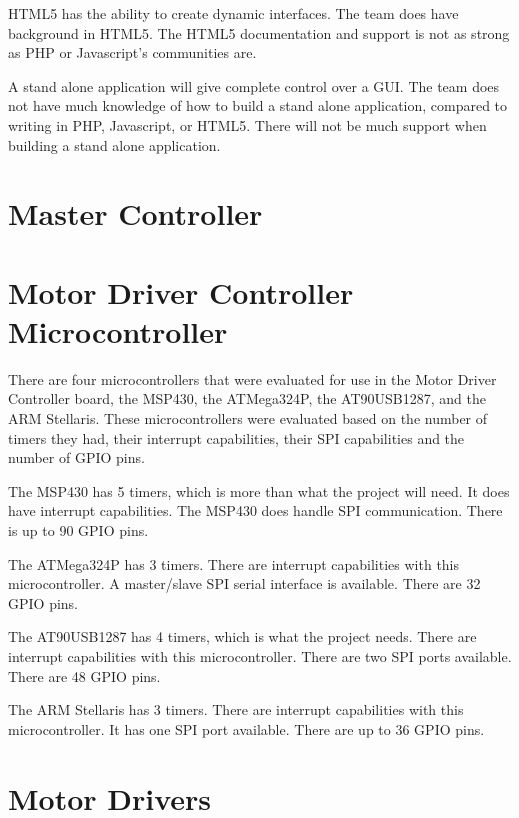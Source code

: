 HTML5 has the ability to create dynamic interfaces.
The team does have background in HTML5.
The HTML5 documentation and support is not as strong as PHP or Javascript's communities are.

A stand alone application will give complete control over a GUI.
The team does not have much knowledge of how to build a stand alone application, compared to writing in PHP, Javascript, or HTML5.
There will not be much support when building a stand alone application.

\section{Master Controller}

\section{Motor Driver Controller Microcontroller}
There are four microcontrollers that were evaluated for use in the Motor Driver Controller board, the MSP430, the ATMega324P, the AT90USB1287, and the ARM Stellaris.
These microcontrollers were evaluated based on the number of timers they had, their interrupt capabilities, their SPI capabilities and the number of GPIO pins.

The MSP430 has 5 timers, which is more than what the project will need.
It does have interrupt capabilities.
The MSP430 does handle SPI communication. 
There is up to 90 GPIO pins.

The ATMega324P has 3 timers.
There are interrupt capabilities with this microcontroller.
A master/slave SPI serial interface is available.
There are 32 GPIO pins.   

The AT90USB1287 has 4 timers, which is what the project needs.
There are interrupt capabilities with this microcontroller.
There are two SPI ports available. 
There are 48 GPIO pins.

The ARM Stellaris has 3 timers.
There are interrupt capabilities with this microcontroller.
It has one SPI port available.
There are up to 36 GPIO pins.
\section{Motor Drivers}